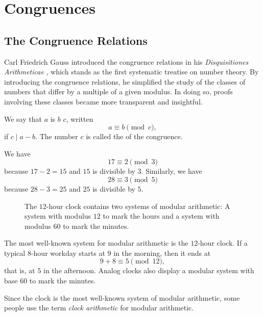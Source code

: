 \chapter{Congruences}\label{chapter:congruences}

\section{The Congruence Relations}

Carl Friedrich Gauss introduced the congruence relations in his \emph{Disquisitiones Arithmeticae} \cite{gauss1986}, which stands as the first systematic treatise on number theory. By introducing the congruence relations, he simplified the study of the classes of numbers that differ by a multiple of a given modulus. In doing so, proofs involving these classes became more transparent and insightful.

\begin{definition}
  We say that $a$ is  $b$  $c$, written
  \begin{equation*}
    a \equiv b \pmod{c},
  \end{equation*}
  if $c\mid a-b$. The number $c$ is called the  of the congruence.
\end{definition}

\begin{example}
  We have
  \begin{equation*}
    17 \equiv 2 \pmod{3}
  \end{equation*}
  because $17-2=15$ and $15$ is divisible by $3$. Similarly, we have
  \begin{equation*}
    28 \equiv 3 \pmod{5}
  \end{equation*}
  because $28-3=25$ and $25$ is divisible by $5$.
\end{example}

\begin{figure}[t]
  \centering
  
  \SwissClock[hours=10,minutes=10,seconds=32.04]
  \caption[The $12$-hour clock]{The $12$-hour clock contains two systems of modular arithmetic: A system with modulus $12$ to mark the hours and a system with modulus $60$ to mark the minutes.}
  \label{figure:clock}
\end{figure}

\begin{example}
  The most well-known system for modular arithmetic is the $12$-hour clock. If a typical $8$-hour workday starts at $9$ in the morning, then it ends at
  \begin{equation*}
    9+8\equiv 5\pmod{12},
  \end{equation*}
  that is, at $5$ in the afternoon. Analog clocks also display a modular system with base $60$ to mark the minutes.

  Since the clock is the most well-known system of modular arithmetic, some people use the term \emph{clock arithmetic} for modular arithmetic.
\end{example}

